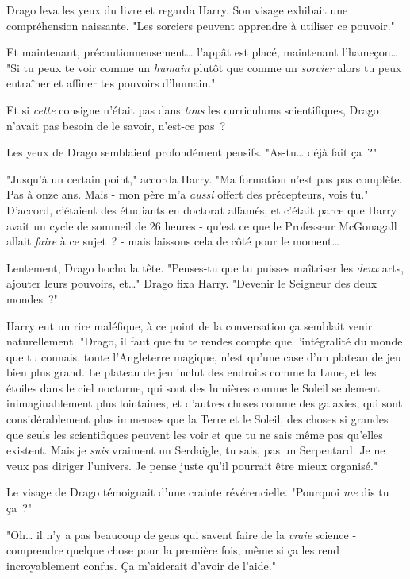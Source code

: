 Drago leva les yeux du livre et regarda Harry. Son visage exhibait une compréhension naissante. "Les sorciers peuvent apprendre à utiliser ce pouvoir."

Et maintenant, précautionneusement… l'appât est placé, maintenant l'hameçon… "Si tu peux te voir comme un \emph{humain} plutôt que comme un \emph{sorcier} alors tu peux entraîner et affiner tes pouvoirs d'humain."

Et si \emph{cette} consigne n'était pas dans \emph{tous} les curriculums scientifiques, Drago n'avait pas besoin de le savoir, n'est-ce pas~?

Les yeux de Drago semblaient profondément pensifs. "As-tu… déjà fait ça~?"

"Jusqu'à un certain point," accorda Harry. "Ma formation n'est pas pas complète. Pas à onze ans. Mais - mon père m'a \emph{aussi} offert des précepteurs, vois tu." D'accord, c'étaient des étudiants en doctorat affamés, et c'était parce que Harry avait un cycle de sommeil de 26 heures - qu'est ce que le Professeur McGonagall allait \emph{faire} à ce sujet~? - mais laissons cela de côté pour le moment…

Lentement, Drago hocha la tête. "Penses-tu que tu puisses maîtriser les \emph{deux} arts, ajouter leurs pouvoirs, et…" Drago fixa Harry. "Devenir le Seigneur des deux mondes~?"

Harry eut un rire maléfique, à ce point de la conversation ça semblait venir naturellement. "Drago, il faut que tu te rendes compte que l'intégralité du monde que tu connais, toute l'Angleterre magique, n'est qu'une case d'un plateau de jeu bien plus grand. Le plateau de jeu inclut des endroits comme la Lune, et les étoiles dans le ciel nocturne, qui sont des lumières comme le Soleil seulement inimaginablement plus lointaines, et d'autres choses comme des galaxies, qui sont considérablement plus immenses que la Terre et le Soleil, des choses si grandes que seuls les scientifiques peuvent les voir et que tu ne sais même pas qu'elles existent. Mais je \emph{suis} vraiment un Serdaigle, tu sais, pas un Serpentard. Je ne veux pas diriger l'univers. Je pense juste qu'il pourrait être mieux organisé."

Le visage de Drago témoignait d'une crainte révérencielle. "Pourquoi \emph{me} dis tu ça~?"

"Oh… il n'y a pas beaucoup de gens qui savent faire de la \emph{vraie} science - comprendre quelque chose pour la première fois, même si ça les rend incroyablement confus. Ça m'aiderait d'avoir de l'aide."

